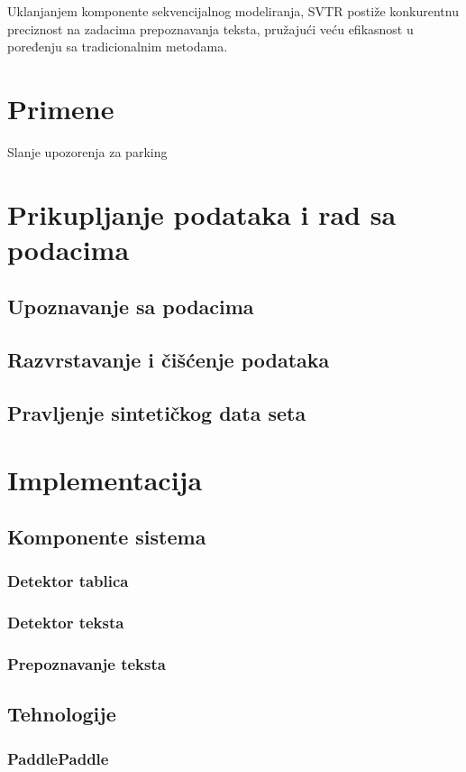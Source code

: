 \documentclass[a4paper,12pt]{article}
\begin{document}
	Uklanjanjem komponente sekvencijalnog modeliranja, SVTR postiže konkurentnu preciznost na zadacima prepoznavanja teksta, pružajući veću efikasnost u poređenju sa tradicionalnim metodama.
	
	\newpage
	
	\section{Primene}
	Slanje upozorenja za parking
	\newpage
	
	\section{Prikupljanje podataka i rad sa podacima}
	\subsection{Upoznavanje sa podacima}
	\subsection{Razvrstavanje i čišćenje podataka}
	\subsection{Pravljenje sintetičkog data seta}
	\newpage
	
	\section{Implementacija}
	\subsection{Komponente sistema}
	\subsubsection{Detektor tablica}
	\subsubsection{Detektor teksta}
	\subsubsection{Prepoznavanje teksta}
	\subsection{Tehnologije}
	\subsubsection{PaddlePaddle}
\end{document}

